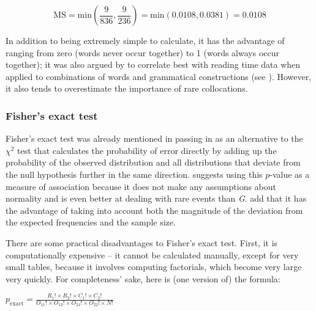 \[\text{MS} = \text{min} \left( \frac{9}{836}, \frac{9}{236} \right) = \text{min} \left( 0.0108,0.0381 \right) = 0.0108\]

In addition to being extremely simple to calculate, it has the advantage of ranging from zero (words never occur together) to 1 (words always occur together); it was also argued by \citet{wiechmann_computation_2008} to correlate  best with reading time data when applied to combinations of words and grammatical constructions (see ). However, it also tends to overestimate the importance of rare  collocations.

\subsubsection{Fisher's exact test}
\label{sec:amfishersexacttest}

Fisher's exact test  was already mentioned in passing in  as an alternative to the $\chi^2$  test that calculates the probability  of error directly by adding up the probability of the observed distribution  and all distributions that deviate from the null hypothesis  further in the same direction. \citet{pedersen_fishing_1996} suggests using this $p$-value as a measure of association  because it does not make any assumptions about normality and is even better at dealing with rare events than \emph{G}.  \citet[238--239]{stefanowitsch_collostructions:_2003} add that it has the advantage of taking into account both the magnitude of the deviation from the expected  frequencies and the sample  size.

There are some practical disadvantages to Fisher's exact test.  First, it is computationally expensive -- it cannot be calculated manually, except for very small tables, because it involves computing factorials, which become very large very quickly. For completeness' sake, here is (one version of) the formula:

\begin{exe}
\ex $\displaystyle{p_\text{exact} = \frac{R_1! \times R_2! \times C_1! \times C_2!}{O_{11}! \times O_{12}! \times O_{21}! \times O_{22}! \times N!}}$
\label{ex:fisherexaxt}
\end{exe}

